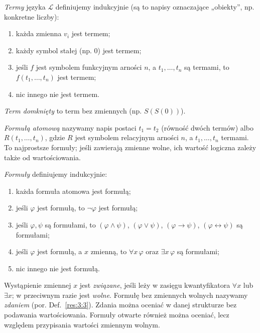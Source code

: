 \begin{definicja}[Term]\label{res:2:8}
\emph{Termy} języka $\mathcal L$ definiujemy indukcyjnie (są to napisy oznaczające „obiekty”, np. konkretne liczby):
\begin{enumerate}[label=(\roman*)]
\item każda zmienna $v_i$ jest termem;
\item każdy symbol stałej (np. $0$) jest termem;
\item jeśli $f$ jest symbolem funkcyjnym arności $n$, a $t_1,\ldots,t_n$ są termami, to $f(t_1,\ldots,t_n)$ jest termem;
\item nic innego nie jest termem.
\end{enumerate}
\emph{Term domknięty} to term bez zmiennych (np. $S(S(0))$).
\end{definicja}

\begin{definicja}\label{res:2:9}
\emph{Formułą atomową} nazywamy napis postaci $t_1=t_2$ (równość dwóch termów) albo $R(t_1,\ldots,t_n)$, gdzie $R$ jest symbolem relacyjnym arności $n$, a $t_1,\ldots,t_n$ termami. To najprostsze formuły; jeśli zawierają zmienne wolne, ich wartość logiczna zależy także od wartościowania.
\end{definicja}

\begin{definicja}[Formuła]\label{res:2:10}
\emph{Formuły} definiujemy indukcyjnie:
\begin{enumerate}[label=(\roman*)]
\item każda formuła atomowa jest formułą;
\item jeśli $\varphi$ jest formułą, to $\neg\varphi$ jest formułą;
\item jeśli $\varphi,\psi$ są formułami, to $(\varphi\land\psi)$, $(\varphi\lor\psi)$, $(\varphi\to\psi)$, $(\varphi\leftrightarrow\psi)$ są formułami;
\item jeśli $\varphi$ jest formułą, a $x$ zmienną, to $\forall x\,\varphi$ oraz $\exists x\,\varphi$ są formułami;
\item nic innego nie jest formułą.
\end{enumerate}
\end{definicja}

\begin{definicja}\label{res:2:11}
Wystąpienie zmiennej $x$ jest \emph{związane}, jeśli leży w zasięgu kwantyfikatora $\forall x$ lub $\exists x$; w przeciwnym razie jest \emph{wolne}. Formułę bez zmiennych wolnych nazywamy \emph{zdaniem} (por. Def.~\ref{res:3:3}). Zdania można oceniać w danej strukturze bez podawania wartościowania. Formuły otwarte również można oceniać, lecz względem przypisania wartości zmiennym wolnym.
\end{definicja}

